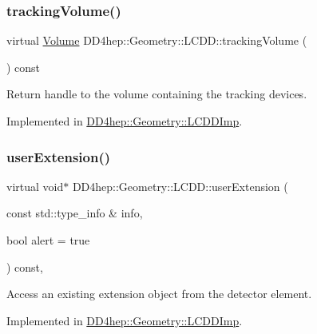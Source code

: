 \subsubsection{\texorpdfstring{tracking\+Volume()}{trackingVolume()}}
{\footnotesize\ttfamily virtual \hyperlink{class_d_d4hep_1_1_geometry_1_1_volume}{Volume} D\+D4hep\+::\+Geometry\+::\+L\+C\+D\+D\+::tracking\+Volume (\begin{DoxyParamCaption}{ }\end{DoxyParamCaption}) const\hspace{0.3cm}{\ttfamily [pure virtual]}}



Return handle to the volume containing the tracking devices. 



Implemented in \hyperlink{class_d_d4hep_1_1_geometry_1_1_l_c_d_d_imp_a72808bae8f16fbf283a30af7a82e46cf}{D\+D4hep\+::\+Geometry\+::\+L\+C\+D\+D\+Imp}.

\hypertarget{class_d_d4hep_1_1_geometry_1_1_l_c_d_d_a699d446afe8b33487cdce57d4e2f26c6}{}\label{class_d_d4hep_1_1_geometry_1_1_l_c_d_d_a699d446afe8b33487cdce57d4e2f26c6} 
\subsubsection{\texorpdfstring{user\+Extension()}{userExtension()}}
{\footnotesize\ttfamily virtual void$\ast$ D\+D4hep\+::\+Geometry\+::\+L\+C\+D\+D\+::user\+Extension (\begin{DoxyParamCaption}\item[{const std\+::type\+\_\+info \&}]{info,  }\item[{bool}]{alert = {\ttfamily true} }\end{DoxyParamCaption}) const\hspace{0.3cm}{\ttfamily [protected]}, {}}



Access an existing extension object from the detector element. 



Implemented in \hyperlink{class_d_d4hep_1_1_geometry_1_1_l_c_d_d_imp_a70ec931894a57b006aea63beddd38263}{D\+D4hep\+::\+Geometry\+::\+L\+C\+D\+D\+Imp}.

\hypertarget{class_d_d4hep_1_1_geometry_1_1_l_c_d_d_adf89eaa970c7c23b6896f79a6ad28b7f}{}\label{class_d_d4hep_1_1_geometry_1_1_l_c_d_d_adf89eaa970c7c23b6896f79a6ad28b7f} 
